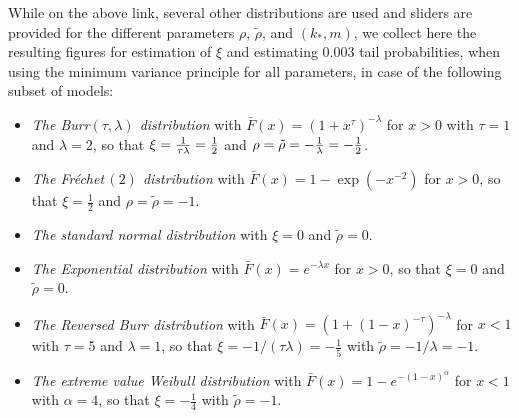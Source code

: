 \documentclass[twoside,leqno,11pt]{article}
\begin{document}
\noindent  
  While on the above link, several other distributions are used and sliders are provided for the different parameters $\rho$, $\tilde\rho$, and $(k_*,m)$, we collect here the resulting figures for estimation of $\xi$ and estimating 0.003 tail probabilities, when using the minimum variance principle for all parameters, in case of the following subset of models: 
\begin{itemize}
\item
	{\it The Burr$\left(\tau,\lambda\right)$ distribution} with  $\bar{F}(x)= \left(1+x^{\tau} \right)^{-\lambda}$ for $x>0$ with $\tau=1$ and $\lambda=2$, so that $\xi= {1 \over \tau\lambda}={1 \over 2}$ and $\rho= \tilde\rho=-{1 \over \lambda}= -{1 \over 2}$. 
\item
	{\it The Fr\'echet$\,(2)$ distribution} with  $\bar{F}(x)= 1-\exp \left(-x^{-2} \right)$ for $x>0$, so that $\xi = \frac{1}{2}$ and $\rho= \tilde\rho=-1$.
		\item 
	{\it The standard normal distribution} with  $\xi=0$ and $\tilde{\rho}=0$.
	\item 	{\it The Exponential distribution} with $\bar{F}(x) = e^{-\lambda x}$ for $x>0$, so that $\xi=0$ and $\tilde{\rho}=0$.
		\item
	{\it The Reversed Burr distribution} with 
	$\bar{F}(x) =\left(1+(1-x)^{-\tau}\right)^{-\lambda}$
	 for $x< 1$ with $\tau=5$ and $\lambda=1$, so that $\xi = -1/(\tau\lambda)=-\frac{1}{5}$ with $\tilde{\rho}=-1/\lambda=-1$.
	 \item
	{\it The extreme value Weibull distribution} with 
	$\bar{F}(x) =1-e^{-(1-x)^{\alpha}}$
	 for $x< 1$ with $\alpha =4$, so that $\xi = -\frac{1}{4}$ with $\tilde{\rho}=-1$.
\end{itemize}
\end{document}
